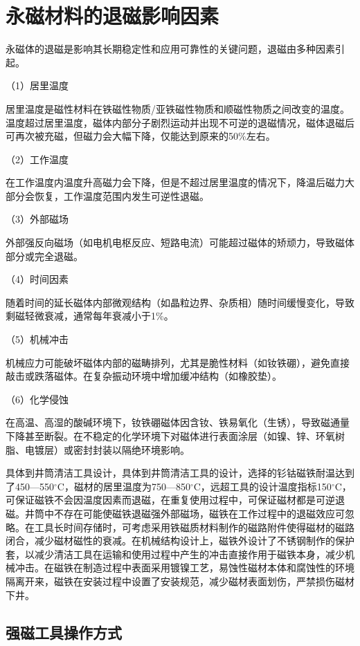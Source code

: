 \section{永磁材料的退磁影响因素}

永磁体的退磁是影响其长期稳定性和应用可靠性的关键问题，退磁由多种因素引起。

（1）居里温度

居里温度是磁性材料在铁磁性物质/亚铁磁性物质和顺磁性物质之间改变的温度。温度超过居里温度，磁体内部分子剧烈运动并出现不可逆的退磁情况，磁体退磁后可再次被充磁，但磁力会大幅下降，仅能达到原来的50\%左右。

（2）工作温度

在工作温度内温度升高磁力会下降，但是不超过居里温度的情况下，降温后磁力大部分会恢复，工作温度范围内发生可逆性退磁。

（3）外部磁场

外部强反向磁场（如电机电枢反应、短路电流）可能超过磁体的矫顽力，导致磁体部分或完全退磁。

（4）时间因素

随着时间的延长磁体内部微观结构（如晶粒边界、杂质相）随时间缓慢变化，导致剩磁轻微衰减，通常每年衰减小于1\%。

（5）机械冲击

机械应力可能破坏磁体内部的磁畴排列，尤其是脆性材料（如钕铁硼），避免直接敲击或跌落磁体。在复杂振动环境中增加缓冲结构（如橡胶垫）。

（6）化学侵蚀

在高温、高湿的酸碱环境下，钕铁硼磁体因含钕、铁易氧化（生锈），导致磁通量下降甚至断裂。在不稳定的化学环境下对磁体进行表面涂层（如镍、锌、环氧树脂、电镀层）或密封封装以隔绝环境影响。

具体到井筒清洁工具设计，具体到井筒清洁工具的设计，选择的钐钴磁铁耐温达到了450—550$^\circ$C，磁材的居里温度为750—850$^\circ$C，远超工具的设计温度指标150$^\circ$C，可保证磁铁不会因温度因素而退磁，在重复使用过程中，可保证磁材都是可逆退磁。井筒中不存在可能使磁铁退磁强外部磁场，磁铁在工作过程中的退磁效应可忽略。在工具长时间存储时，可考虑采用铁磁质材料制作的磁路附件使得磁材的磁路闭合，减少磁材磁性的衰减。在机械结构设计上，磁铁外设计了不锈钢制作的保护套，以减少清洁工具在运输和使用过程中产生的冲击直接作用于磁铁本身，减少机械冲击。在磁铁在制造过程中表面采用镀镍工艺，易蚀性磁材本体和腐蚀性的环境隔离开来，磁铁在安装过程中设置了安装规范，减少磁材表面划伤，严禁损伤磁材下井。

\subsection{强磁工具操作方式}

